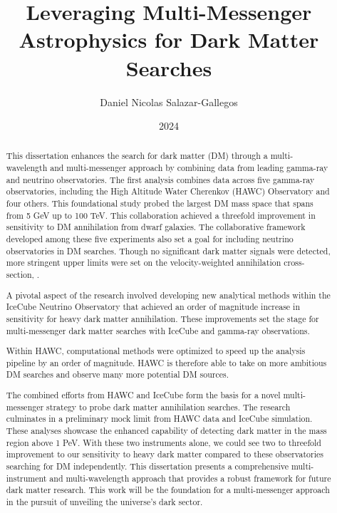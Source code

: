 \documentclass[PhD]{msu-thesis}
\title{Leveraging Multi-Messenger Astrophysics for Dark Matter Searches}
\author{Daniel Nicolas Salazar-Gallegos}
\date{2024}
\begin{document}
\frontmatter
\maketitlepage

\begin{abstract}

    This dissertation enhances the search for dark matter (DM) through a multi-wavelength and multi-messenger approach by combining data from leading gamma-ray and neutrino observatories.
    The first analysis combines data across five gamma-ray observatories, including the High Altitude Water Cherenkov (HAWC) Observatory and four others.
    This foundational study probed the largest DM mass space that spans from 5 GeV up to 100 TeV.
    This collaboration  achieved a threefold improvement in sensitivity to DM annihilation from dwarf galaxies.
    The collaborative framework developed among these five experiments also set a goal for including neutrino observatories in DM searches.
    Though no significant dark matter signals were detected, more stringent upper limits were set on the velocity-weighted annihilation cross-section, \sv.

    A pivotal aspect of the research involved developing new analytical methods within the IceCube Neutrino Observatory that achieved an order of magnitude increase in sensitivity for heavy dark matter annihilation.
    These improvements set the stage for multi-messenger dark matter searches with IceCube and gamma-ray observations.

    Within HAWC, computational methods were optimized to speed up the analysis pipeline by an order of magnitude.
    HAWC is therefore able to take on more ambitious DM searches and observe many more potential DM sources.

    The combined efforts from HAWC and IceCube form the basis for a novel multi-messenger strategy to probe dark matter annihilation searches.
    The research culminates in a preliminary mock limit from HAWC data and IceCube simulation.
    These analyses showcase the enhanced capability of detecting dark matter in the mass region above 1 PeV.
    With these two instruments alone, we could see two to threefold improvement to our sensitivity to heavy dark matter compared to these observatories searching for DM independently.
    This dissertation presents a comprehensive multi-instrument and multi-wavelength approach that provides a robust framework for future dark matter research.
    This work will be the foundation for a multi-messenger approach in the pursuit of unveiling the universe's dark sector.

\end{abstract}
\end{document}
